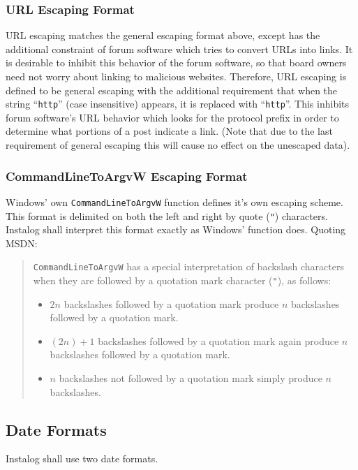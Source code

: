 \subsubsection{URL Escaping Format} \label{urlescape}
URL escaping matches the general escaping format above, except has the
additional constraint of forum software which tries to convert URLs into links.
It is desirable to inhibit this behavior of the forum software, so that board
owners need not worry about linking to malicious websites. Therefore, URL
escaping is defined to be general escaping with the additional requirement that
when the string ``\texttt{http}'' (case insensitive) appears, it is replaced
with ``\texttt{htt}\texttt{p}''. This inhibits forum
software's URL behavior which looks for the protocol prefix in order to
determine what portions of a post indicate a link. (Note that due to the last
requirement of general escaping this will cause no effect on the unescaped
data).

\subsubsection{CommandLineToArgvW Escaping Format} \label{winescape}
Windows' own \verb|CommandLineToArgvW| function defines it's own escaping
scheme. This format is delimited on both the left and right by quote (\verb|"|)
characters. Instalog shall interpret this format exactly as Windows' function
does. Quoting MSDN:

\begin{quote}
\verb|CommandLineToArgvW| has a special interpretation of backslash characters
when they are followed by a quotation mark character (\verb|"|), as follows:
\begin{itemize}
    \item $2n$ backslashes followed by a quotation mark produce $n$ backslashes
    followed by a quotation mark.
    \item $(2n) + 1$ backslashes followed by a quotation mark again produce $n$
    backslashes followed by a quotation mark.
    \item $n$ backslashes not followed by a quotation mark simply produce $n$
    backslashes.
\end{itemize}
\end{quote}

\subsection{Date Formats}
Instalog shall use two date formats.


